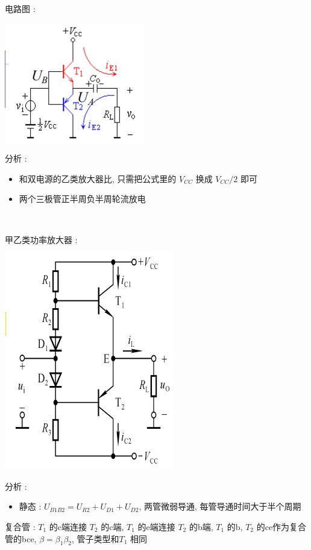 \documentclass[UTF8, 12pt]{ctexart}
\begin{document}
	电路图 :

	\includegraphics[scale = 0.4]{04/单电源OTL互补功率放大电路.png}

	分析 :
	\begin{itemize}[leftmargin = 4em]
		\item 和双电源的乙类放大器比, 只需把公式里的 $ V_{CC} $ 换成 $ V_{CC}/2 $ 即可
		\item 两个三极管正半周负半周轮流放电
 	\end{itemize}

	~

	\noindent
	甲乙类功率放大器 :

	\includegraphics[scale = 0.4]{04/甲乙类功率放大器电路图.png}

	分析 :
	\begin{itemize}[leftmargin = 4em]
		\item 静态 : $ U_{B1B2} = U_{R2}+U_{D1}+U_{D2} $, 两管微弱导通, 每管导通时间大于半个周期
	\end{itemize}

	复合管 : $ T_{1} $ 的c端连接 $ T_{2} $ 的c端, $ T_{1} $ 的e端连接 $ T_{2} $ 的b端, $ T_{1} $ 的b, $ T_{2} $ 的ce作为复合管的bce, $ \beta = \beta_{1}\beta_{2} $, 管子类型和$ T_{1} $ 相同
\end{document}
